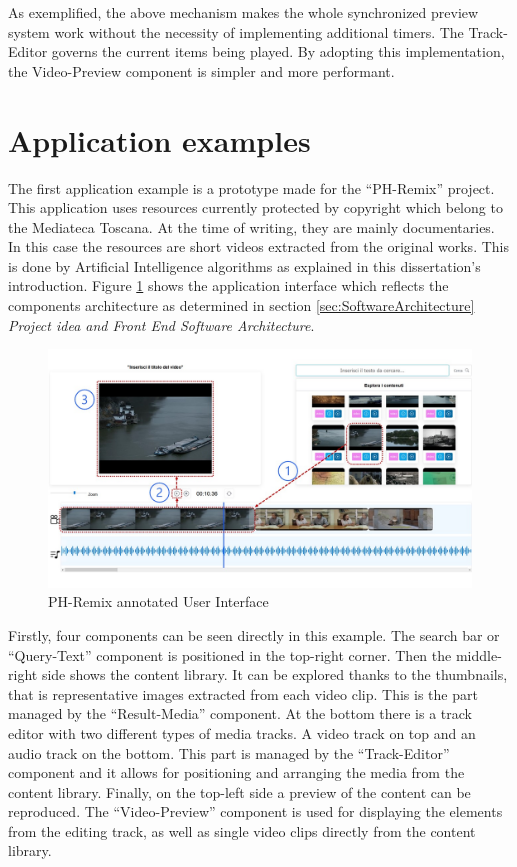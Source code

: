 As exemplified, the above mechanism makes the whole synchronized preview system work without the necessity of implementing additional timers. The Track-Editor governs the current items being played. By adopting this implementation, the Video-Preview component is simpler and more performant.

\section{Application examples}
\label{sec:appExamples}

The first application example is a prototype made for the “PH-Remix” project. This application uses resources currently protected by copyright which belong to the Mediateca Toscana. At the time of writing, they are mainly documentaries. In this case the resources are short videos extracted from the original works. This is done by Artificial Intelligence algorithms as explained in this dissertation’s introduction. Figure \ref{fig:phRmxOverview} shows the application interface which reflects the components architecture as determined in section \ref{sec:SoftwareArchitecture} \emph{Project idea and Front End Software Architecture}.

\begin{figure}[H]
\centering
\includegraphics[width=1\textwidth]{images/PH-REmixannotatedUI.jpg}
\caption{PH-Remix annotated User Interface}
\label{fig:phRmxOverview}
\end{figure}

Firstly, four components can be seen directly in this example. The search bar or “Query-Text” component is positioned in the top-right corner. Then the middle-right side shows the content library. It can be explored thanks to the thumbnails, that is representative images extracted from each video clip. This is the part managed by the “Result-Media” component. At the bottom there is a track editor with two different types of media tracks. A video track on top and an audio track on the bottom. This part is managed by the “Track-Editor” component and it allows for positioning and arranging the media from the content library. Finally, on the top-left side a preview of the content can be reproduced. The “Video-Preview” component is used for displaying the elements from the editing track, as well as single video clips directly from the content library.

